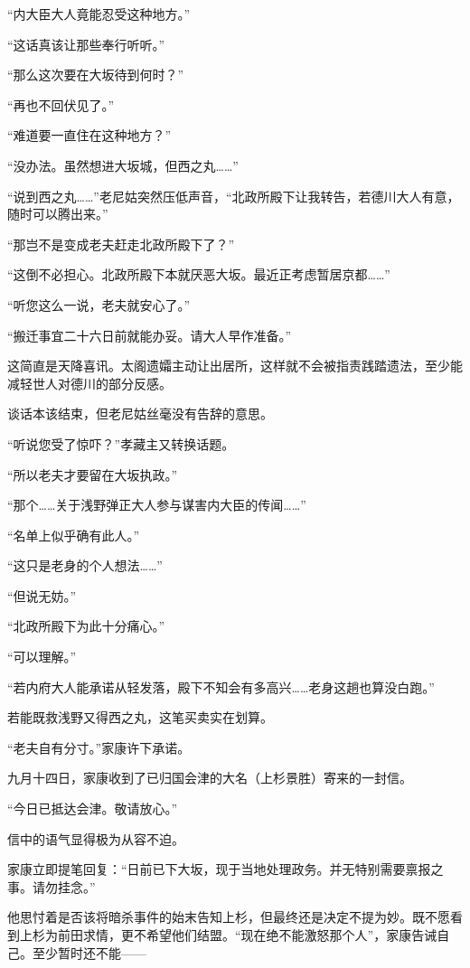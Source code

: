 \documentclass[
]{book}
\begin{document}
``内大臣大人竟能忍受这种地方。''

``这话真该让那些奉行听听。''

``那么这次要在大坂待到何时？''

``再也不回伏见了。''

``难道要一直住在这种地方？''

``没办法。虽然想进大坂城，但西之丸\ldots\ldots{}''

``说到西之丸\ldots\ldots{}''老尼姑突然压低声音，``北政所殿下让我转告，若德川大人有意，随时可以腾出来。''

``那岂不是变成老夫赶走北政所殿下了？''

``这倒不必担心。北政所殿下本就厌恶大坂。最近正考虑暂居京都\ldots\ldots{}''

``听您这么一说，老夫就安心了。''

``搬迁事宜二十六日前就能办妥。请大人早作准备。''

这简直是天降喜讯。太阁遗孀主动让出居所，这样就不会被指责践踏遗法，至少能减轻世人对德川的部分反感。

谈话本该结束，但老尼姑丝毫没有告辞的意思。

``听说您受了惊吓？''孝藏主又转换话题。

``所以老夫才要留在大坂执政。''

``那个\ldots\ldots 关于浅野弹正大人参与谋害内大臣的传闻\ldots\ldots{}''

``名单上似乎确有此人。''

``这只是老身的个人想法\ldots\ldots{}''

``但说无妨。''

``北政所殿下为此十分痛心。''

``可以理解。''

``若内府大人能承诺从轻发落，殿下不知会有多高兴\ldots\ldots 老身这趟也算没白跑。''

若能既救浅野又得西之丸，这笔买卖实在划算。

``老夫自有分寸。''家康许下承诺。

九月十四日，家康收到了已归国会津的大名（上杉景胜）寄来的一封信。

``今日已抵达会津。敬请放心。''

信中的语气显得极为从容不迫。

家康立即提笔回复：``日前已下大坂，现于当地处理政务。并无特别需要禀报之事。请勿挂念。''

他思忖着是否该将暗杀事件的始末告知上杉，但最终还是决定不提为妙。既不愿看到上杉为前田求情，更不希望他们结盟。``现在绝不能激怒那个人''，家康告诫自己。至少暂时还不能------
\end{document}
